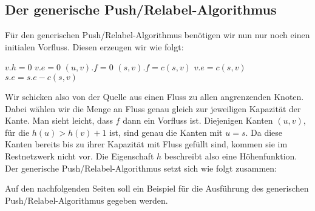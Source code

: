 \documentclass[12pt,a4paper,titlepage,onecolumn,ngerman,bibliography=totocnumbered]{scrartcl}
\theoremstyle{definition}
\theoremstyle{remark}
\newcommand{\pr}{Push/Relabel}
\begin{document}
\subsection{Der generische \pr -Algorithmus}
Für den generischen \pr -Algorithmus benötigen wir nun nur noch einen initialen Vorfluss.
Diesen erzeugen wir wie folgt:
\begin{algorithm}[H]
	\caption{Initialize-Preflow(G,s)}
	\label{alg:initialize_preflow}
	\begin{algorithmic}[1]
		\State $v.h = 0$
		\State $v.e = 0$
		\EndFor
		\State $(u,v).f = 0$
		\EndFor
		\State $(s,v).f = c(s,v)$
		\State $v.e = c(s,v)$
		\State $s.e = s.e - c(s,v)$
		\EndFor
	\end{algorithmic}
\end{algorithm}
Wir schicken also von der Quelle aus einen Fluss zu allen angrenzenden Knoten.
Dabei wählen wir die Menge an Fluss genau gleich zur jeweiligen Kapazität der Kante.
Man sieht leicht, dass $f$ dann ein Vorfluss ist.
Diejenigen Kanten $(u,v)$, für die $h(u) > h(v) + 1$ ist, sind genau die Kanten mit $u = s$.
Da diese Kanten bereits bis zu ihrer Kapazität mit Fluss gefüllt sind, kommen sie im Restnetzwerk nicht vor.
Die Eigenschaft $h$ beschreibt also eine Höhenfunktion.
\medbreak
Der generische \pr -Algorithmus setzt sich wie folgt zusammen:
\begin{algorithm}[H]
	\caption{Generic-\pr}
	\label{alg:generic_pr}
	\begin{algorithmic}[1]
		\EndWhile
	\end{algorithmic}
\end{algorithm}
Auf den nachfolgenden Seiten soll ein Beispiel für die Ausführung des generischen \pr -Algorithmus gegeben werden.
\end{document}
